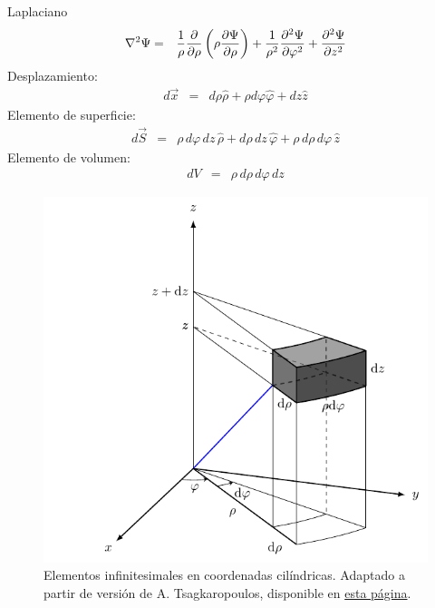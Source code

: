 Laplaciano
\begin{eqnarray}
 \nabla^2 \Psi
&=& {1 \over \rho}{\partial \over \partial \rho}\left(\rho {\partial\Psi\over
\partial \rho}\right)
  + {1 \over \rho^2}{\partial^2\Psi\over \partial \varphi^2}
  + {\partial^2\Psi\over \partial z^2} \\
\end{eqnarray}
Desplazamiento:
\begin{eqnarray}
 d \vec{x}
 &=& d\rho {\hat \rho} + \rho d\varphi {\hat \varphi} +dz {\hat z}
\end{eqnarray}
Elemento de superficie:
\begin{eqnarray}
 d \vec{S}
&=& \rho\, d\varphi\, dz\, {\hat \rho} + d\rho
\,dz\, {\hat \varphi} +  \rho \,d\rho\, d\varphi \, {\hat z}
\end{eqnarray}
Elemento de volumen:
\begin{eqnarray}
 dV
 &=& \rho\, d\rho\, d\varphi\, dz
\end{eqnarray}
\begin{figure}[H]
    \centering
    \includegraphics[scale=0.7]{fig/volumen-cilindricas.pdf}
    \caption{Elementos infinitesimales en coordenadas cilíndricas. Adaptado a partir de versión de A. Tsagkaropoulos, disponible en \href{https://tikz.net/cylindrical_volume/}{esta página}.}
    \label{fig:Vol-Cilindricas}
\end{figure}
